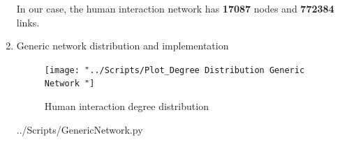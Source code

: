 \documentclass[10pt,a4paper]{article}
\begin{document}
\begin{enumerate}
	In our case, the human interaction network has \textbf{17087} nodes and \textbf{772384} links.
	
	
	\item Generic network distribution and implementation 
	
	
\begin{figure}[H]
	\centering
	\texttt{[image: "../Scripts/Plot\_Degree Distribution Generic Network "]}
	\caption[Human interaction network plot]{Human interaction degree distribution}
	\label{fig:plot4degree-distribution-generic-network-}
\end{figure}
	
	 {../Scripts/GenericNetwork.py}
	
	
	
\end{enumerate}	
	
\end{document}
